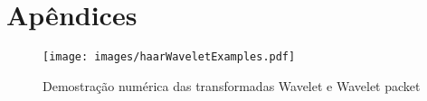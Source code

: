 \chapter{Apêndices}
	\begin{landscape}
		\begin{myenv}{1.5}
			\begin{figure}
				\texttt{[image: images/haarWaveletExamples.pdf]}
				\caption{Demostração numérica das transformadas Wavelet e Wavelet packet}
				\label{fig:haarWaveletExamples}
			\end{figure}
		\end{myenv}
	\end{landscape}
	